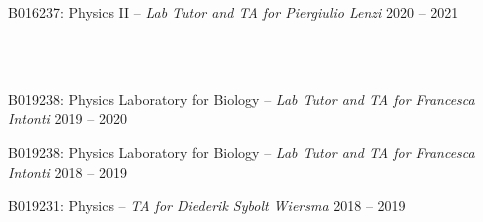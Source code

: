 \begin{cvcontent}
\begin{itemize*}[label=\textcolor{iconcolor}{\textbullet}]
    \item B016237: Physics II -- \emph{\small Lab Tutor and TA for Piergiulio Lenzi} \hfill {\normalsize \color{hlcolor-2} 2020 -- 2021}
  \end{itemize*}
  \\ [3mm]
  \\ [0.5mm]
  \begin{itemize*}[label=\textcolor{iconcolor}{\textbullet}]
    \item B019238: Physics Laboratory for Biology -- \emph{\small Lab Tutor and TA for Francesca Intonti} \hfill {\normalsize \color{hlcolor-2} 2019 -- 2020}\\ [0.5mm]
    \item B019238: Physics Laboratory for Biology -- \emph{\small Lab Tutor and TA for Francesca Intonti} \hfill {\normalsize \color{hlcolor-2} 2018 -- 2019}\\ [0.5mm]
    \item B019231: Physics -- \emph{\small TA for Diederik Sybolt Wiersma} \hfill {\normalsize \color{hlcolor-2} 2018 -- 2019}
  \end{itemize*}
\end{cvcontent}